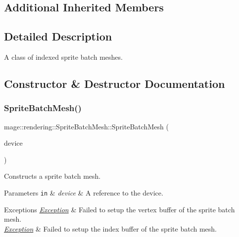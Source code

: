 \subsection*{Additional Inherited Members}


\subsection{Detailed Description}
A class of indexed sprite batch meshes. 

\subsection{Constructor \& Destructor Documentation}
\mbox{\label{classmage_1_1rendering_1_1_sprite_batch_mesh_a992adb566fc9718869f0c6e6f1391df7}} 
\subsubsection{\texorpdfstring{Sprite\+Batch\+Mesh()}{SpriteBatchMesh()}\hspace{0.1cm}{\footnotesize\ttfamily [1/3]}}
{\footnotesize\ttfamily mage\+::rendering\+::\+Sprite\+Batch\+Mesh\+::\+Sprite\+Batch\+Mesh (\begin{DoxyParamCaption}\item[{I\+D3\+D11\+Device \&}]{device }\end{DoxyParamCaption})\hspace{0.3cm}{\ttfamily [explicit]}}

Constructs a sprite batch mesh.


\begin{DoxyParams}[1]{Parameters}
\mbox{\tt in}  & {\em device} & A reference to the device. \\
\hline
\end{DoxyParams}

\begin{DoxyExceptions}{Exceptions}
{\em \mbox{\hyperlink{classmage_1_1_exception}{Exception}}} & Failed to setup the vertex buffer of the sprite batch mesh. \\
\hline
{\em \mbox{\hyperlink{classmage_1_1_exception}{Exception}}} & Failed to setup the index buffer of the sprite batch mesh. \\
\hline
\end{DoxyExceptions}
\mbox{\label{classmage_1_1rendering_1_1_sprite_batch_mesh_a961b1df4f0e0b8dc17f968a5e61c2ce6}} 
